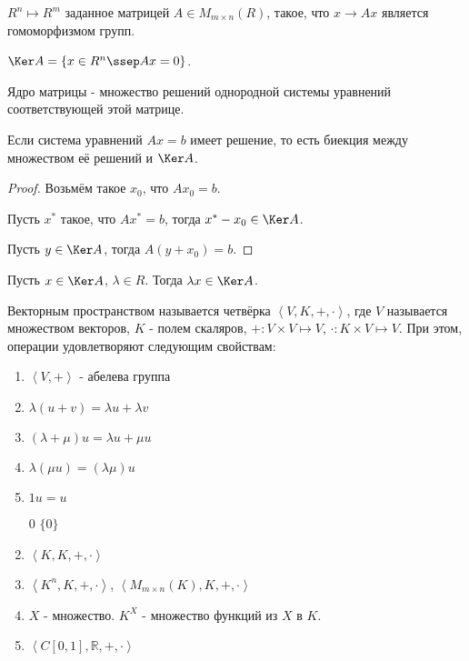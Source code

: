 \begin{consequence} \thmslashn

    $R^{n} \mapsto R^{m}$ заданное матрицей $A\in M_{m \times n}(R)$, такое, что $x \to Ax$ является гомоморфизмом групп.
\end{consequence}
\begin{definition} \thmslashn 

$\Ker A = \{x\in R^{n}\ssep Ax = 0\} $.

Ядро матрицы - множество решений однородной системы уравнений соответствующей этой матрице.
\end{definition}
\begin{consequence} \thmslashn

    Если система уравнений $Ax = b$ имеет решение, то есть биекция между множеством её решений и $\Ker A$.
    \begin{proof}
        Возьмём такое $x_0$, что $Ax_0 = b$.

        Пусть $x^{*}$ такое, что $Ax^{*} = b$, тогда $x^{*} - x_0\in \Ker A$.

        Пусть $y\in \Ker A$, тогда $A(y + x_0) = b$.
    \end{proof}
\end{consequence}
\begin{lemma} \thmslashn

    Пусть $x\in \Ker A$, $\lambda\in R$. Тогда $\lambda x\in \Ker A$.
\end{lemma}
\begin{definition} \thmslashn 

    Векторным пространством называется четвёрка $\left<V, K, +, \cdot\right>$, где $V$ называется множеством векторов, $K$ - полем скаляров, $+ : V \times V \mapsto V$, $\cdot : K \times V \mapsto V$. При этом, операции удовлетворяют следующим свойствам:
    \begin{enumerate}
        \item $\left<V, +\right>$ - абелева группа
        \item $\lambda(u+v) = \lambda u + \lambda v$
        \item $\left( \lambda + \mu \right)u = \lambda u + \mu u $ 
        \item $\lambda (\mu u) = (\lambda \mu) u$
        \item  $1 u = u$
    \end{enumerate}
\end{definition}
\begin{example} \thmslashn

    \begin{enumerate}
        \item[0] $\{0\} $ 
        \item $\left<K, K, +, \cdot \right>$ 
        \item $\left<K^{n}, K, +, \cdot \right>$, $\left<M_{m \times n}(K), K, +, \cdot \right>$ 
        \item $X$ - множество. $K^{X}$ - множество функций из $X$ в $K$.
        \item $\left<C\left[0, 1\right], \mathbb{R}, +, \cdot \right>$
    \end{enumerate}
\end{example}
